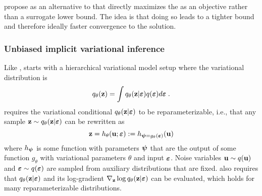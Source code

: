 \documentclass[10pt]{article}
\begin{document}
\citet{Titsias:2019} propose \uivi as an alternative to \sivi that directly maximizes the \elbo as an objective rather than a surrogate lower bound. The idea is that doing so leads to a tighter \elbo bound and therefore ideally faster convergence to the solution.

\subsubsection{Unbiased implicit variational inference}

Like \sivi, \uivi starts with a hierarchical variational model setup where the variational distribution is
\[
q_\theta(\mathbf{z}) = \int q_\theta(\mathbf{z}|\bm{\varepsilon})q(\bm{\varepsilon})d\bm{\varepsilon} \;.
\]
\uivi requires the variational conditional $q_\theta(\mathbf{z}|\bm{\varepsilon})$ to be reparameterizable, i.e., that any sample $\mathbf{z}\sim q_\theta(\mathbf{z}|\bm{\varepsilon})$ can be rewritten as
\[
\mathbf{z} = h_\theta(\mathbf{u};\bm{\varepsilon}) := h_{\bm{\psi}=g_\theta(\bm{\varepsilon})}(\mathbf{u}) 
\]
where $h_{\bm{\psi}}$ is some function with parameters $\bm{\psi}$ that are the output of some function $g_\theta$ with variational parameters $\theta$ and input $\bm{\varepsilon}$. Noise variables $\mathbf{u}\sim q(\mathbf{u})$ and $\bm{\varepsilon}\sim q(\bm{\varepsilon})$ are sampled from auxiliary distributions that are fixed. \uivi also requires that $q_\theta(\mathbf{z}|\bm{\varepsilon})$ and its log-gradient $\nabla_{\mathbf{z}}\log q_\theta(\mathbf{z}|\bm{\varepsilon})$ can be evaluated, which holds for many reparameterizable distributions.
\\
\end{document}
